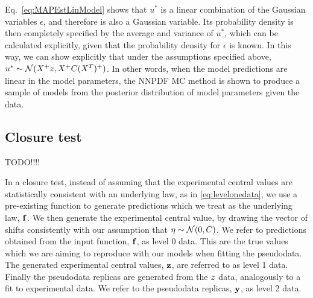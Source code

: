 Eq.~\ref{eq:MAPEstLinModel} shows that $u^*$ is a linear combination of the
Gaussian variables $\epsilon$, and therefore is also a Gaussian variable. Its
probability density is then completely specified by the average and variance of
$u^*$, which can be calculated explicitly, given that the probability density
for $\epsilon$ is known.  In this way, we can show explicitly that under the
assumptions specified above, $u^{*} \sim \mathcal{N}( X^+z, X^+ C (X^T)^+)$.
In other words, when the model predictions are linear in the model parameters,
the NNPDF MC method is shown to produce a sample of models from the posterior
distribution of model parameters given the data.

\subsection{Closure test}

TODO!!!!

In a closure test, instead of assuming that the experimental central values are
statistically consistent with an underlying law, as in \eqref{eq:levelonedata},
we use a pre-existing function to generate predictions which we treat as the
underlying law, $\mathbf{f}$. We then generate the experimental
central value, by drawing the vector of shifts consistently with our assumption
that $\mathbf{\eta} \sim \mathcal{N}(0, C)$. We refer to predictions obtained
from the input function, $\mathbf{f}$, as level 0 data. This are the true values
which we are aiming to reproduce with our models when fitting the pseudodata.
The generated
experimental central values, $\mathbf{z}$, are referred to as level 1 data.
Finally the pseudodata replicas are generated from the $z$ data,
analogously to a fit to experimental data. We refer to the pseudodata replicas,
$\mathbf{y}$, as level 2 data.

